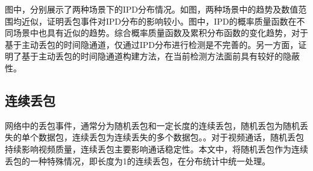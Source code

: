 
图中，分别展示了两种场景下的IPD分布情况。如图，两种场景中的趋势及数值范围均近似，证明丢包事件对IPD分布的影响较小。图中，IPD的概率质量函数在不同场景中也具有近似的趋势。综合概率质量函数及累积分布函数的变化趋势，对于基于主动丢包的时间隐通道，仅通过IPD分布进行检测是不完善的。另一方面，证明了基于主动丢包的时间隐通道构建方法，在当前检测方法面前具有较好的隐蔽性。

\subsection{连续丢包}
\label{chap:analyze:results:burst}

网络中的丢包事件，通常分为随机丢包和一定长度的连续丢包，随机丢包为随机丢失的单个数据包，连续丢包为连续丢失的多个数据包。。对于视频通话，随机丢包持续影响视频质量，连续丢包主要影响通话稳定性。本文中，将随机丢包作为连续丢包的一种特殊情况，即长度为1的连续丢包，在分布统计中统一处理。

